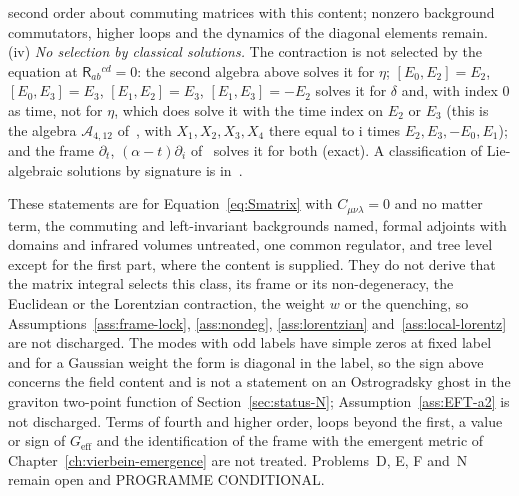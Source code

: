 second order about commuting matrices with this content; nonzero background commutators, higher loops and the dynamics of the diagonal elements remain. (iv) \emph{No selection by classical solutions.} The contraction is not selected by the equation at \(\mathsf R_{ab}{}^{cd}=0\): the second algebra above solves it for \(\eta\); \([E_0,E_2]=E_2\), \([E_0,E_3]=E_3\), \([E_1,E_2]=E_3\), \([E_1,E_3]=-E_2\) solves it for \(\delta\) and, with index \(0\) as time, not for \(\eta\), which does solve it with the time index on \(E_2\) or \(E_3\) (this is the algebra \(\mathcal A_{4,12}\) of~\cite{Chatzistavrakidis2011}, with \(X_1,X_2,X_3,X_4\) there equal to \(\mathrm i\) times \(E_2,E_3,-E_0,E_1\)); and the frame \(\partial_t\), \((\alpha-t)\partial_i\) of~\cite{IsonoTomino2010} solves it for both (exact). A classification of Lie-algebraic solutions by signature is in~\cite{Liao2026}.

These statements are for Equation~\eqref{eq:Smatrix} with \(C_{\mu\nu\lambda}=0\) and no matter term, the commuting and left-invariant backgrounds named, formal adjoints with domains and infrared volumes untreated, one common regulator, and tree level except for the first part, where the content is supplied. They do not derive that the matrix integral selects this class, its frame or its non-degeneracy, the Euclidean or the Lorentzian contraction, the weight \(w\) or the quenching, so Assumptions~\ref{ass:frame-lock}, \ref{ass:nondeg}, \ref{ass:lorentzian} and~\ref{ass:local-lorentz} are not discharged. The modes with odd labels have simple zeros at fixed label and for a Gaussian weight the form is diagonal in the label, so the sign above concerns the field content and is not a statement on an Ostrogradsky ghost in the graviton two-point function of Section~\ref{sec:status-N}; Assumption~\ref{ass:EFT-a2} is not discharged. Terms of fourth and higher order, loops beyond the first, a value or sign of \(G_{\mathrm{eff}}\) and the identification of the frame with the emergent metric of Chapter~\ref{ch:vierbein-emergence} are not treated. Problems~D, E, F and~N remain open and PROGRAMME CONDITIONAL.

